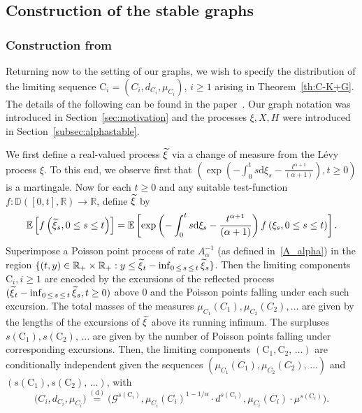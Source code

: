 \documentclass[AHL,Unicode,longabstracts,published]{cedram}
\newcommand{\E}[1]{\ensuremath{\mathbb{E} \left[#1 \right]}}
\newcommand{\equidist}{\ensuremath{\stackrel{\mathrm{(d)}}{=}}}
\newcommand{\rmd}{\mathrm{d}}
\newcommand{\rmC}{\mathrm{C}}
\newcommand{\cG}{\mathcal{G}}
\newcommand{\R}{\mathbb{R}}
\newcommand{\bbD}{\mathbb{D}}
\let\oldtilde\tilde
\renewcommand*{\tilde}[1]{\mathchoice{\widetilde{#1}}{\widetilde{#1}}{\oldtilde{#1}}{\oldtilde{#1}}}
\newcommand{\R}{\mathbb{R}}
\begin{document}
\subsection{Construction of the stable graphs}\label{sec:SLconfiguration}

\subsubsection{Construction from~\cite{CKG17+}}
Returning now to the setting of our graphs, we wish to specify the distribution of the limiting sequence $\rmC_i = (C_i, d_{C_i}, \mu_{C_i})$, $i \ge 1$ arising in Theorem~\ref{th:C-K+G}. The details of the following can be found in the paper~\cite{CKG17+}. Our graph notation was introduced in Section~\ref{sec:motivation} and the processes $\xi, X, H$ were introduced in Section~\ref{subsec:alphastable}.

We first define a real-valued process $\tilde{\xi}$ via a change of measure from the Lévy process $\xi$. To this end, we observe first that $(\exp(-\int_0^t s \rmd \xi_s - \frac{t^{\alpha+1}}{(\alpha+1)}), t \ge 0)$ is a martingale. Now for each $t \ge 0$ and any suitable test-function $f: \bbD([0,t], \R) \to \R$, define $\tilde{\xi}$ by
\[
\E{f\left(\tilde{\xi}_s, 0 \le s \le t\right)} = \E{\exp \left(-\int_0^t s \rmd \xi_s - \frac{t^{\alpha+1}}{(\alpha+1)} \right) f\left(\xi_s, 0 \le s \le t\right)}.
\]
Superimpose a Poisson point process of rate $A_{\alpha}^{-1}$ (as defined in~\eqref{A_alpha}) in the region $\{(t,y) \in \R_+ \times \R_+: y \le \tilde\xi_t - \inf_{0\,\le\,s\,\le\,t} \tilde \xi_s\}$. Then the limiting components $\rmC_i,i\geq 1$ are encoded by the excursions of the reflected process $(\tilde \xi_t - \inf_{0\,\le\,s\,\le\,t} \tilde \xi_s, t \ge 0)$ above 0 and the Poisson points falling under each such excursion. The total masses of the measures $\mu_{C_1}(C_1), \mu_{C_2}(C_2), \ldots$ are given by the lengths of the excursions of $\tilde{\xi}$ above its running infimum. The surpluses $s(\rmC_1), s(\rmC_2),\,\ldots$ are given by the number of Poisson points falling under corresponding excursions. Then, the limiting components $(\rmC_1, \rmC_2,\,\ldots)$ are conditionally independent given the sequences $(\mu_{C_1}(C_1), \mu_{C_2}(C_2),\,\ldots)$ and $(s(\rmC_1), s(\rmC_2),\,\ldots)$, with
\[
\big(C_i, d_{C_i}, \mu_{C_i} \big)\equidist \big(\cG^{s(\rmC_i)}, \mu_{C_i}(C_i)^{1-1/\alpha} \cdot d^{s(\rmC_i)}, \mu_{C_i}(C_i) \cdot \mu^{s(\rmC_i)}\big).
\]
\end{document}
